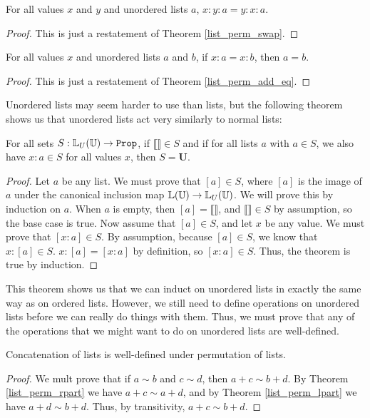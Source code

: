 \documentclass[../../math.tex]{subfiles}
\begin{document}
\begin{theorem} \label{ulist_swap}
    For all values $x$ and $y$ and unordered lists $a$, $x : y : a = y : x : a$.
\end{theorem}
\begin{proof}
    This is just a restatement of Theorem \ref{list_perm_swap}.
\end{proof}

\begin{theorem} \label{ulist_add_eq}
    For all values $x$ and unordered lists $a$ and $b$, if $x : a = x : b$, then
    $a = b$.
\end{theorem}
\begin{proof}
    This is just a restatement of Theorem \ref{list_perm_add_eq}.
\end{proof}

Unordered lists may seem harder to use than lists, but the following theorem
shows us that unordered lists act very similarly to normal lists:

\begin{theorem}
    For all sets $S : \set{\L_U(\U)}$, if $\llbracket\rrbracket \in S$ and if
    for all lists $a$ with $a \in S$, we also have $x : a \in S$ for all values
    $x$, then $S = \bm U$.
\end{theorem}
\begin{proof}
    Let $a$ be any list.  We must prove that $[a] \in S$, where $[a]$ is the
    image of $a$ under the canonical inclusion map $\mathbb{L}(\mathbb{U}) \to \mathbb{L}_U(\mathbb{U})$.  We
    will prove this by induction on $a$.  When $a$ is empty, then $[a] =
    \llbracket \rrbracket$, and $\llbracket \rrbracket \in S$ by assumption, so
    the base case is true.  Now assume that $[a] \in S$, and let $x$ be any
    value.  We must prove that $[x : a] \in S$.  By assumption, because $[a] \in
    S$, we know that $x : [a] \in S$.  $x : [a] = [x : a]$ by definition, so $[x
    : a] \in S$.  Thus, the theorem is true by induction.
\end{proof}

This theorem shows us that we can induct on unordered lists in exactly the same
way as on ordered lists.  However, we still need to define operations on
unordered lists before we can really do things with them.  Thus, we must prove
that any of the operations that we might want to do on unordered lists are
well-defined.

\begin{lemma}
    Concatenation of lists is well-defined under permutation of lists.
\end{lemma}
\begin{proof}
    We mult prove that if $a \sim b$ and $c \sim d$, then $a + c \sim b + d$.
    By Theorem \ref{list_perm_rpart} we have $a + c \sim a + d$, and by Theorem
    \ref{list_perm_lpart} we have $a + d \sim b + d$.  Thus, by transitivity, $a
    + c \sim b + d$.
\end{proof}
\end{document}
